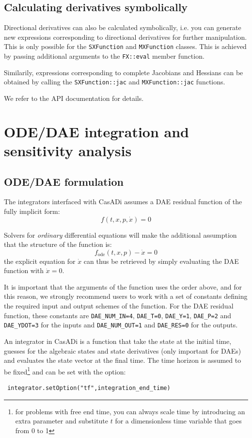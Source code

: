 \documentclass[a4paper,12pt]{book}
\begin{document}
{\section{Calculating derivatives symbolically}
Directional derivatives can also be calculated symbolically, i.e. you can generate new expressions corresponding to directional derivatives for further manipulation. This is only possible for the \texttt{SXFunction} and \texttt{MXFunction} classes.
This is achieved by passing additional arguments to the \texttt{FX::eval} member function.

Similarily, expressions corresponding to complete Jacobians and Hessians can be obtained by calling the \texttt{SXFunction::jac} and \texttt{MXFunction::jac} functions.

We refer to the API documentation for details.

\chapter{ODE/DAE integration and sensitivity analysis} \label{chapter:integrators}
\section{ODE/DAE formulation}
The integrators interfaced with CasADi assumes a DAE residual function of the fully implicit form:
\begin{equation}
 f(t,x,p,\dot{x}) = 0
\end{equation}

Solvers for \emph{ordinary} differential equations will make the additional assumption that the structure of the function is:
\begin{equation}
 f_{\text{ode}}(t,x,p) - \dot{x} = 0
\end{equation}
the explicit equation for $\dot{x}$ can thus be retrieved by simply evaluating the DAE function with $\dot{x} = 0$.

It is important that the arguments of the function uses the order above, and for this reason, we strongly recommend users to work with a set of constants defining the required input and output schemes of the function. For the DAE residual function, these constants are \texttt{DAE\_NUM\_IN=4}, \texttt{DAE\_T=0}, \texttt{DAE\_Y=1}, \texttt{DAE\_P=2} and \texttt{DAE\_YDOT=3} for the inputs and \texttt{DAE\_NUM\_OUT=1} and \texttt{DAE\_RES=0} for the outputs.

An integrator in CasADi is a function that take the state at the initial time, guesses for the algebraic states and state derivatives (only important for DAEs) and evaluates the state vector at the final time. The time horizon is assumed to be fixed\footnote{for problems with free end time, you can always scale time by introducing an extra parameter and substitute $t$ for a dimensionless time variable that goes from 0 to 1} and can be set with the option:
\begin{verbatim}
 integrator.setOption("tf",integration_end_time)
\end{verbatim}

}
\end{document}
